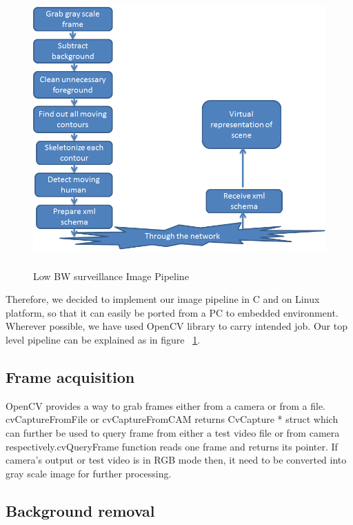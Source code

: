 \begin{figure}[!t]
\centering
\includegraphics[height=300pt]{Figures/image_pipeline}
\caption{Low BW surveillance Image Pipeline}
\label{image_pipeline}
\end{figure}

\indent Therefore, we decided to implement our image pipeline in C and
on Linux platform, so that it can easily be ported from a PC to embedded
environment. Wherever possible, we have used OpenCV library to carry
intended job. Our top level pipeline can be explained as in figure
~\ref{image_pipeline}.\\

\subsection{Frame acquisition}

\indent OpenCV provides a way to grab frames either from a camera or
from a file. cvCaptureFromFile or cvCaptureFromCAM returns CvCapture *
struct which can further be used to query frame from either a test video
file or from camera respectively.cvQueryFrame function reads one frame
and returns its pointer. If camera's output or test video is in RGB mode
then, it need to be converted into gray scale image for further
processing.

\subsection{Background removal}

